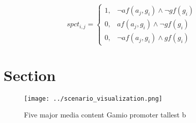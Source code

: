 \documentclass[a4paper]{article}
\begin{document}
\begin{equation}
spct_{i,j} =
\begin{cases}
1, & \text{$\neg af(a_j,g_i) \wedge \neg gf(g_i)$}\\
0, & \text{$af(a_j,g_i) \wedge \neg gf(g_i)$}\\
0, & \text{$\neg af(a_j,g_i) \wedge gf(g_i)$}
\end{cases}
\end{equation}

\section{Section}

\begin{figure}
\centering
\texttt{[image: ../scenario\_visualization.png]}
\caption{Five major media content Gamio promoter tallest b
}
\end{figure}
 
\end{document}
